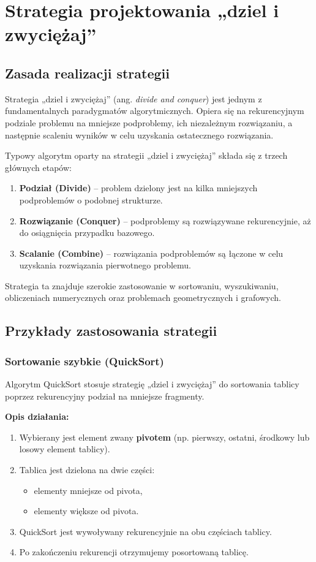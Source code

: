 \section{Strategia projektowania „dziel i zwyciężaj”}

\subsection{Zasada realizacji strategii}
Strategia „dziel i zwyciężaj” (ang. \textit{divide and conquer}) jest jednym z fundamentalnych paradygmatów algorytmicznych. Opiera się na rekurencyjnym podziale problemu na mniejsze podproblemy, ich niezależnym rozwiązaniu, a następnie scaleniu wyników w celu uzyskania ostatecznego rozwiązania.

Typowy algorytm oparty na strategii „dziel i zwyciężaj” składa się z trzech głównych etapów:
\begin{enumerate}
    \item \textbf{Podział (Divide)} – problem dzielony jest na kilka mniejszych podproblemów o podobnej strukturze.
    \item \textbf{Rozwiązanie (Conquer)} – podproblemy są rozwiązywane rekurencyjnie, aż do osiągnięcia przypadku bazowego.
    \item \textbf{Scalanie (Combine)} – rozwiązania podproblemów są łączone w celu uzyskania rozwiązania pierwotnego problemu.
\end{enumerate}

Strategia ta znajduje szerokie zastosowanie w sortowaniu, wyszukiwaniu, obliczeniach numerycznych oraz problemach geometrycznych i grafowych.

\subsection{Przykłady zastosowania strategii}

\subsubsection{Sortowanie szybkie (QuickSort)}
Algorytm QuickSort stosuje strategię „dziel i zwyciężaj” do sortowania tablicy poprzez rekurencyjny podział na mniejsze fragmenty.

\textbf{Opis działania:}
\begin{enumerate}
    \item Wybierany jest element zwany \textbf{pivotem} (np. pierwszy, ostatni, środkowy lub losowy element tablicy).
    \item Tablica jest dzielona na dwie części:
        \begin{itemize}
            \item elementy mniejsze od pivota,
            \item elementy większe od pivota.
        \end{itemize}
    \item QuickSort jest wywoływany rekurencyjnie na obu częściach tablicy.
    \item Po zakończeniu rekurencji otrzymujemy posortowaną tablicę.
\end{enumerate}

